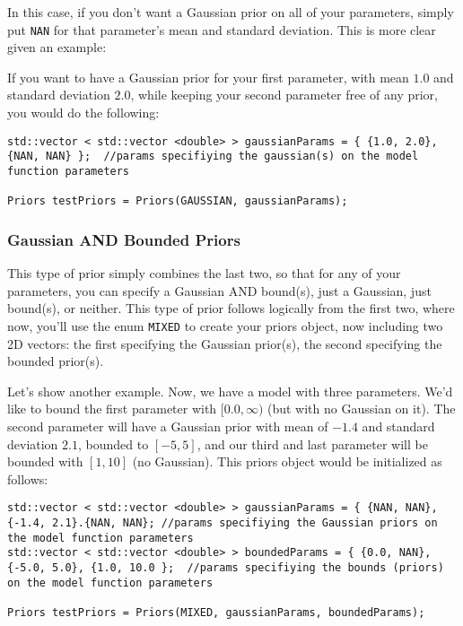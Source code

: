 \documentclass[12pt]{article}
\newcommand{\li}{\lstinline}
\begin{document}
In this case, if you don't want a Gaussian prior on all of your parameters, simply put \li{NAN} for that parameter's mean and standard deviation. This is more clear given an example:
\par If you want to have a Gaussian prior for your first parameter, with mean $1.0$ and standard deviation $2.0$, while keeping your second parameter free of any prior, you would do the following:
\begin{lstlisting}
std::vector < std::vector <double> > gaussianParams = { {1.0, 2.0}, {NAN, NAN} };  //params specifiying the gaussian(s) on the model function parameters

Priors testPriors = Priors(GAUSSIAN, gaussianParams);
\end{lstlisting}

\subsubsection{Gaussian AND Bounded Priors}
\par This type of prior simply combines the last two, so that for any of your parameters, you can specify a Gaussian AND bound(s), just a Gaussian, just bound(s), or neither. This type of prior follows logically from the first two, where now, you'll use the enum \li{MIXED} to create your priors object, now including two 2D vectors: the first specifying the Gaussian prior(s), the second specifying the bounded prior(s).
\par Let's show another example. Now, we have a model with three parameters. We'd like to bound the first parameter with $[0.0,\infty)$ (but with no Gaussian on it). The second parameter will have a Gaussian prior with mean of $-1.4$ and standard deviation $2.1$, bounded to $[-5,5]$, and our third and last parameter will be bounded with $[1, 10]$ (no Gaussian). This priors object would be initialized as follows:
\begin{lstlisting}
std::vector < std::vector <double> > gaussianParams = { {NAN, NAN}, {-1.4, 2.1}.{NAN, NAN}; //params specifiying the Gaussian priors on the model function parameters
std::vector < std::vector <double> > boundedParams = { {0.0, NAN}, {-5.0, 5.0}, {1.0, 10.0 };  //params specifiying the bounds (priors) on the model function parameters

Priors testPriors = Priors(MIXED, gaussianParams, boundedParams);
\end{lstlisting}
\end{document}
